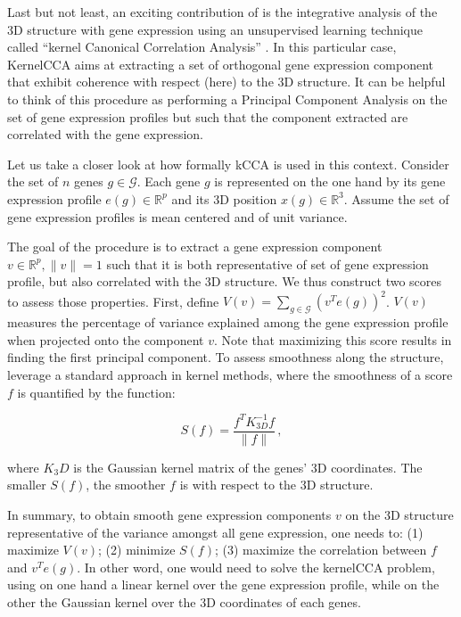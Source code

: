 \documentclass[letterpaper,12pt]{article}
\newcommand{\RR}{\mathbb{R}}
\begin{document}
Last but not least, an exciting contribution of \citet{ay:three-dimensional}
is the integrative analysis of the 3D structure with gene expression using an
unsupervised learning technique called ``kernel Canonical Correlation
Analysis'' \citep{bach:kernel}. In this particular case,  KernelCCA aims at
extracting a set of orthogonal gene expression component that exhibit
coherence with respect (here) to the 3D structure. It can be helpful to
think of this procedure as performing a Principal Component Analysis on the
set of gene expression profiles but such that the component extracted are
correlated with the gene expression.

Let us take a closer look at how formally kCCA is used in this context.
Consider the set of $n$ genes $g \in \mathcal{G}$. Each gene $g$ is
represented on the one hand by its gene expression profile $e(g) \in \RR^{p}$
and its 3D position $x(g) \in \RR^3$. Assume the set of gene expression
profiles is mean centered and of unit variance.

The goal of the procedure is to extract a gene expression component $v\in
\RR^p, \|v\|=1$ such that it is both representative of set of gene expression profile,
but also correlated with the 3D structure. We thus construct two scores to
assess those properties. First, define $V(v) = \underset{g \in
\mathcal{G}}{\sum} (v^T e(g))^2$. $V(v)$ measures the percentage of variance
explained among the gene expression profile when projected onto the component
$v$. Note that maximizing this score results in finding the first principal
component. To assess smoothness along the structure,
\citet{ay:three-dimensional} leverage a standard approach in kernel methods,
where the smoothness of a score $f$ is quantified by the function:

\begin{equation}
S(f) = \frac{f^TK^{-1}_{3D}f}{\|f\|}\,,
\end{equation}

where $K_3D$ is the Gaussian kernel matrix of the genes' 3D coordinates. The
smaller $S(f)$, the smoother $f$ is with respect to the 3D structure.

In summary, to obtain smooth gene expression components $v$ on the 3D
structure representative of the variance amongst all gene expression, one
needs to: (1) maximize $V(v)$; (2) minimize $S(f)$; (3) maximize the
correlation between $f$ and $v^T e(g)$. In other word, one would need to solve
the kernelCCA problem, using on one hand a linear kernel over the gene
expression profile, while on the other the Gaussian kernel over the 3D
coordinates of each genes.
\end{document}
